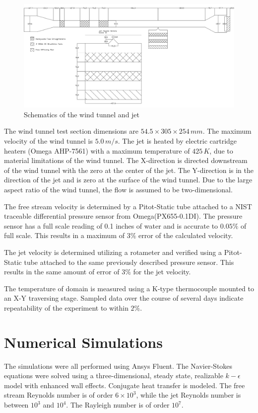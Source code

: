 \documentclass[preprint,12pt]{elsarticle}
\begin{document}
\begin{figure}[!tbp]
\begin{center}
\includegraphics[scale=.30]{windtunneljet.jpg}
\caption{Schematics of the wind tunnel and jet}
\label{fig:diagramjet}
\end{center}
\end{figure}

The wind tunnel test section dimensions are $54.5\times305\times 254\,mm$.  The maximum velocity of the wind tunnel is $5.0\,m/s$.  The jet is heated by electric cartridge heaters (Omega AHP-7561) with a maximum temperature of $425\,K$, due to material limitations of the wind tunnel.  The X-direction is directed downstream of the wind tunnel with the zero at the center of the jet.  The Y-direction is in the direction of the jet and is zero at the surface of the wind tunnel.  Due to the large aspect ratio of the wind tunnel, the flow is assumed to be two-dimensional.

The free stream velocity is determined by a Pitot-Static tube attached to a NIST traceable differential pressure sensor from Omega(PX655-0.1DI).  The pressure sensor has a full scale reading of 0.1 inches of water and is accurate to $0.05\%$ of full scale.  This results in a maximum of $3\%$ error of the calculated velocity.

The jet velocity is determined utilizing a rotameter and verified using a Pitot-Static tube attached to the same previously described pressure sensor.  This results in the same amount of error of $3\%$ for the jet velocity.

The temperature of domain is measured using a K-type thermocouple mounted to an X-Y traversing stage.  Sampled data over the course of several days indicate repeatability of the experiment to within $2\%$.

\section{Numerical Simulations}
The simulations were all performed using Ansys Fluent\cite{fluentsoftware}.  The Navier-Stokes equations were solved using a three-dimensional, steady state, realizable $k-\epsilon$ model with enhanced wall effects.  Conjugate heat transfer is modeled.  The free stream Reynolds number is of order $6\times10^3$, while the jet Reynolds number is between $10^3$ and $10^4$.  The Rayleigh number is of order $10^7$.
\end{document}
